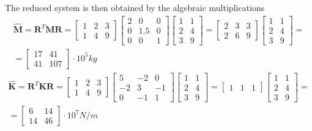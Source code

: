 The reduced system is then obtained by the algebraic multiplications
\begin{multline*}
\hat{\mathbf{M}} = \mathbf{R}^T \mathbf{M} \mathbf{R} =
\begin{bmatrix}
    1 & 2 & 3 \\
    1 & 4 & 9
\end{bmatrix}
\begin{bmatrix}
    2 & 0 & 0 \\
    0 & 1.5 & 0 \\
    0 & 0 & 1
\end{bmatrix}
\begin{bmatrix}
    1 & 1 \\
    2 & 4 \\
    3 & 9
\end{bmatrix} =
\begin{bmatrix}
    2 & 3 & 3 \\
    2 & 6 & 9
\end{bmatrix}
\begin{bmatrix}
    1 & 1 \\
    2 & 4 \\
    3 & 9
\end{bmatrix} = \\
= \begin{bmatrix}
    17 & 41 \\
    41 & 107
\end{bmatrix} \cdot 10^5 kg
\end{multline*}
\begin{multline*}
\hat{\mathbf{K}} = \mathbf{R}^T \mathbf{K} \mathbf{R} =
\begin{bmatrix}
    1 & 2 & 3 \\
    1 & 4 & 9
\end{bmatrix}
\begin{bmatrix}
    5 & -2 & 0 \\
    -2 & 3 & -1 \\
    0 & -1 & 1
\end{bmatrix}
\begin{bmatrix}
    1 & 1 \\
    2 & 4 \\
    3 & 9
\end{bmatrix} =
\begin{bmatrix}
    1 & 1 & 1
\end{bmatrix}
\begin{bmatrix}
    1 & 1 \\
    2 & 4 \\
    3 & 9
\end{bmatrix} = \\
= \begin{bmatrix}
    6 & 14 \\
    14 & 46
\end{bmatrix} \cdot 10^7 N/m
\end{multline*}

